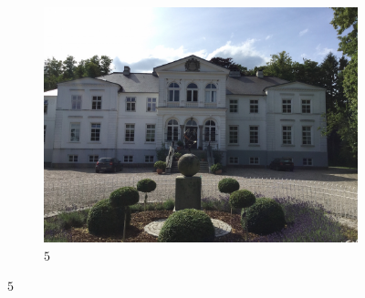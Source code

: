 \begin{figure}[h]
\begin{subfigure}{.33\textwidth}
      \includegraphics[width=\textwidth]{gfx/manor_imgs/5.JPG}
      \caption{$5$}
   \end{subfigure}


\end{figure}
